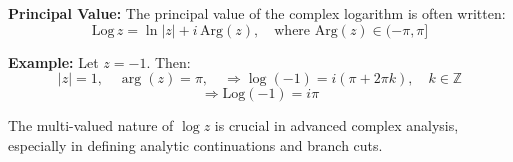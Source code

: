 \textbf{Principal Value:}  
The principal value of the complex logarithm is often written:
\[
\mathrm{Log}\,z = \ln |z| + i\,\mathrm{Arg}(z), \quad \text{where } \mathrm{Arg}(z) \in (-\pi, \pi]
\]

\textbf{Example:}  
Let \( z = -1 \). Then:
\[
|z| = 1, \quad \arg(z) = \pi, \quad \Rightarrow \log(-1) = i(\pi + 2\pi k), \quad k \in \mathbb{Z}
\]
\[
\Rightarrow \mathrm{Log}(-1) = i\pi
\]

The multi-valued nature of \( \log z \) is crucial in advanced complex analysis, especially in defining analytic continuations and branch cuts.
\newpage
